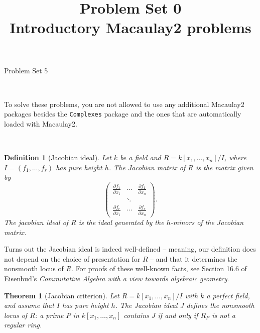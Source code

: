 \documentclass[11pt]{article}
\title{}
\date{\vspace{-0.5in}}
\title{Problem Set 0 \\ Introductory Macaulay2 problems}
\newtheorem*{theorem}{Theorem}
\newtheorem*{definition}{Definition}
\theoremstyle{definition}
\begin{document}
\thispagestyle{fancy}
\pagestyle{fancy}


\begin{center}
	{\LARGE Problem Set 5\\
	
	
}
\end{center}

\

To solve these problems, you are not allowed to use any additional Macaulay2 packages besides the \texttt{Complexes} package and the ones that are automatically loaded with Macaulay2.


\

\begin{definition}[Jacobian ideal]
	Let $k$ be a field and $R = k[x_1, \ldots, x_n]/I$, where $I = (f_1, \ldots, f_r)$ has pure height $h$. The \emph{Jacobian matrix} of $R$ is the matrix given by
	$$\begin{pmatrix}
		\frac{\partial f_1}{\partial x_1} & \cdots & \frac{\partial f_1}{\partial x_n} \\ & \ddots & \\
		\frac{\partial f_r}{\partial x_1} & \cdots & \frac{\partial f_r}{\partial x_n}
	\end{pmatrix}.$$
	The \emph{jacobian ideal} of $R$ is the ideal generated by the $h$-minors of the Jacobian matrix.
\end{definition}

Turns out the Jacobian ideal is indeed well-defined -- meaning, our definition does not depend on the choice of presentation for $R$ -- and that it determines the nonsmooth locus of $R$. For proofs of these well-known facts, see Section 16.6 of Eisenbud's \emph{Commutative Algebra with a view towards algebraic geometry}.

\begin{theorem}[Jacobian criterion]
	Let $R = k[x_1, \ldots, x_n]/I$ with $k$ a perfect field, and assume that $I$ has pure height $h$. The Jacobian ideal $J$ defines the nonsmooth locus of $R$: a prime $P$ in $k[x_1, \ldots, x_n]$ contains $J$ if and only if $R_P$ is not a regular ring.
\end{theorem}


\
\end{document}
